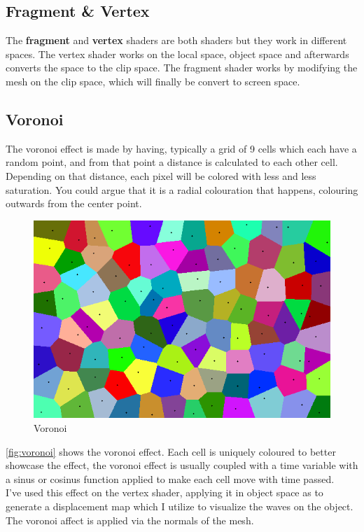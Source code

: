 \documentclass{article}
\begin{document}
\subsection{Fragment \& Vertex}
\label{sec:frag_vert}
The \textbf{fragment} and \textbf{vertex} shaders are both shaders but they work in different spaces. The vertex shader works on the local space, object space and afterwards converts the space to the clip space. The fragment shader works by modifying the mesh on the clip space, which will finally be convert to screen space\cite{progrendervertfrag}.


\subsection{Voronoi}
\label{sec:voronoi}
The voronoi effect is made by having, typically a grid of 9 cells which each have a random point, and from that point a distance is calculated to each other cell. Depending on that distance, each pixel will be colored with less and less saturation. You could argue that it is a radial colouration that happens, colouring outwards from the center point.\\

\begin{figure}[H]
    \centering
    \includegraphics[width=.75\textwidth]{img/voronoi}
    \caption{Voronoi\protect\footnotemark}
    \label{fig:voronoi}
\end{figure}
\autoref{fig:voronoi} shows the voronoi effect. Each cell is uniquely coloured to better showcase the effect, the voronoi effect is usually coupled with a time variable with a sinus or cosinus function applied to make each cell move with time passed.\\

I've used this effect on the vertex shader, applying it in object space as to generate a displacement map which I utilize to visualize the waves on the object. The voronoi affect is applied via the normals of the mesh.
\end{document}
